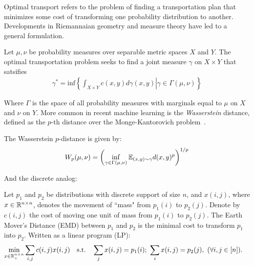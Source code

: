 Optimal transport refers to the problem of finding
a transportation plan that minimizes some cost of transforming
one probability distribution to another.
Developments in Riemannaian geometry and measure theory 
have led to a general formulation.
\begin{definition}\label{def:mongekant}
	Let $\mu,\nu$ be probability measures over separable metric spaces $X$ and $Y$.
	The optimal transportation problem seeks to find a joint measure $\gamma$ on $X\times Y$
	that satsifies
	\begin{align}
	\gamma^* = \text{inf} \left\{\left. \int_{X\times Y} c(x,y) d\gamma(x,y) \right| \gamma \in \Gamma(\mu,\nu) \right\}
	\end{align}
\end{definition}
Where $\Gamma$ is the space of all probability measures with marginals equal to $\mu$ on $X$ and $\nu$ on $Y$.
More common in recent machine learning is the \textit{Wasserstein} distance,
defined as the $p$-th distance over the Monge-Kantorovich problem~\citep{rubenstein}.
\begin{definition}\label{def:wassmetric}
	The Wasserstein $p$-distance is given by:
	\begin{align}
	W_p(\mu, \nu) = \left( \inf_{\gamma \in \Gamma(\mu, \nu)} \mathbb{E}_{(x, y) \sim \gamma} d(x, y)^p \right)^{1/p}
	\end{align}
\end{definition}
And the discrete analog:
\begin{definition}
	Let $p_1$ and $p_2$ be distributions with discrete support of size $n$, and $x(i,j)$, where  $x\in\mathbb{R}^{n\times n}$, denotes the movement of ``mass" from $p_1(i)$ to $p_2(j)$.
	Denote by $c(i,j)$ the cost of moving one unit of mass from  $p_1(i)$ to $p_2(j)$.
	The Earth Mover's Distance (EMD) between $p_1$ and $p_2$ is the minimal cost to transform $p_1$ into $p_2$.
	Written as a linear program (LP):
	\begin{align}\label{eq:2d-emd}
	\begin{aligned}
	\underset{{x\in \RR^{n\times n}_+}}{\textrm{min}} \sum_{i,j} c(i,j) x(i,j) \quad  \textrm{s.t.}\quad \sum_j x(i,j) &= p_1(i); \ 
	\sum_i x(i,j) = p_2(j),\ (\forall i,j\in[n]).
	\end{aligned}
	\end{align}
\end{definition}
